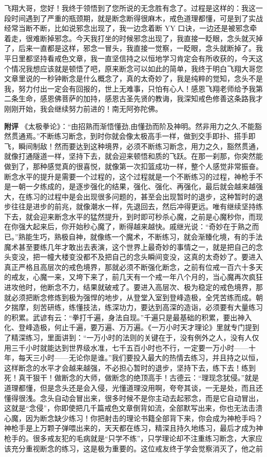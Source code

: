 \begin{case}
    飞翔大哥，您好！我终于领悟到了您所说的无念胜有念了。过程是这样的：我这一段时间遇到了严重的瓶颈期，就是断念断得很麻木，戒色道理都懂，可是到了实战经常当断不断，比如说邪念出现了，我一边念着断 YY 口诀，一边还是被邪念牵着走，很难断掉邪念。今天我打坐的时候邪念出现了，我直接一眨眼，念头就灭掉了，后来一直都是这样，邪念一冒头，我直接一觉察，一眨眼，念头就断掉了。我平日里都坚持看戒色文章，我一直坚信持之以恒地学习肯定会有所收获的，今天这个情况我想应该就是顿悟了吧，原来断念可以如此的简单，我终于明白飞翔大哥您文章里说的一秒钟断念是什么概念了，真的太奇妙了，我是纯粹的觉知，念头不是我，努力付出一定会有回报的，世上无难事，只怕有心人！感恩飞翔老师给予我第二条生命，感恩佛菩萨的加持，感恩古圣先贤的教诲，我深知戒色修善这条路我才刚刚开始，我会继续努力前进的！南无阿弥陀佛。

    \textbf{附评} 《太极拳论》：“由招熟而渐悟懂劲,由懂劲而阶及神明。然非用力之久,不能豁然贯通焉。”不断练习断念，到时你就会像太极高手一样，做到交手即扑、搭手即飞，瞬间制敌！然而要达到这种境界，必须不断练习断念，用力之久，豁然贯通，就像打通隧道一样，坚持下去，就会迎来顿悟和质的飞跃。在那一刹那，你突然能做到了，那种感觉真的很喜悦，就像第一次扣篮成功一样，整个人感觉非常振奋。断念水平的提升是需要一个过程的，这个过程就是一个不断练习的过程，神枪手不是一朝一夕练成的，是逐步强化的结果，强化、强化、再强化，最后就会越来越强大，在练习的过程中是会出现很多问题的，甚至会出现暂时的退步，这种暂时的退步往往是进步的前兆，就像潮水一样，先退回去，然后冲得更远。唯有继续坚持练下去，就会迎来断念水平的猛然提升，到时即可秒杀心魔，之前是心魔秒你，而现在你强大起来后，你开始秒心魔了，断得越来越快。戚继光说：“奇妙在于熟之而已。”熟能生巧，熟极自神，就像练一个魔术，不断练习，就会渐臻化境，有的手法魔术甚至要练几年才敢出去表演，这个世界上最奇妙的事情之一，就是把自己的念头变没，把一幢大楼变没都不及把自己的念头瞬间变没，这真的太奇妙了。要进入真正严格且高层次的戒色境界，那就必须不断强化断念，之前有位戒一百六十多天的戒友，心魔一来，又垮下来了，前几天有一个戒一年八个月的，当心魔再次疯狂进攻他时，他断念不力，结果就破戒了。要进入高层次、极为稳定的戒色境界，那就必须把断念修炼到极为强悍的地步，从登堂入室到登峰造极，全凭苦练而成。朝夕揣摩，刻苦研练，练懂技法，练深功力，要达到高深的造诣，必须要有大量练习的积累。武谚有云：“拳打千遍，身法自现。”千遍只是最基础的积累，要出神入化、登峰造极，何止千遍，要万遍、万万遍。《一万小时天才理论》里就专门提到了精深练习，里面讲到：“一万小时的法则的关键在于，没有例外之人，没有人仅用三千小时就能达到世界级水准，七千五百小时也不行，一定要一万小时——十年，每天三小时——无论你是谁。”我们要投入最大的热情去练习，并且持之以恒，这样断念的水平才会越来越强，不必担心暂时的退步，坚持下去，练下去！练到死！真干狠干！做断念的大师，做断念的绝顶高手！古德云：“理现念犹侵。”就是道理都懂，但是念头还是会入侵，光懂道理没用啊，夸夸其谈，一无是处，而且还懂得很浅。念头自动会冒出来，很多时候不是你主动去起邪念，而是它自动冒出，这就是“念侵”，你即使把几千篇戒色文章倒背如流，全部默写出来，你也无法击溃心魔，因为断念缺少练习！你把射击的理论书籍全部背下来，你会成为神枪手吗？神枪手是上万颗子弹喂出来的，天天都在练习，精深且持久地练习，最后才成为神枪手的。很多戒友犯的毛病就是“只学不练”，只学理论却不注重练习断念，大家应该充分重视断念的练习，这是极为重要的。这位戒友终于学会觉察消灭了，他之前
\end{case}
